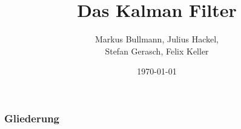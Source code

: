 \documentclass[aspectratio=169,babel]{beamer}
\title{Das Kalman Filter}
\author{Markus Bullmann, Julius Hackel, \\ Stefan Gerasch, Felix Keller}
\date{\today}
\begin{document}
    \maketitle
    \begin{frame}
			\frametitle{Gliederung}
			\tableofcontents
		\end{frame}
    
    
    
    
    
    
\end{document}

